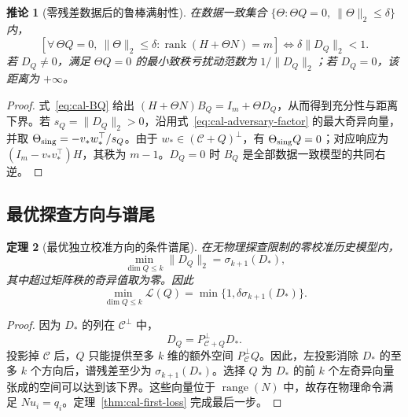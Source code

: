 \documentclass[11pt,a4paper]{article}
\numberwithin{equation}{section}
\newtheorem{theorem}{定理}[section]
\newtheorem{corollary}[theorem]{推论}
\theoremstyle{definition}
\begin{document}
\begin{corollary}[零残差数据后的鲁棒满射性]
\label{rev:cor:conditional-surjectivity}
在数据一致集合 $\{\Theta:\Theta Q=0,\ \|\Theta\|_2\le\delta\}$ 内，
\begin{equation}
 \left[
 \forall\,\Theta Q=0,\ \|\Theta\|_2\le\delta:
 \operatorname{rank}(H+\Theta N)=m
 \right]
 \iff
 \delta\|D_Q\|_2<1 .
 \label{rev:eq:conditional-rank}
\end{equation}
若 $D_Q\ne0$，满足 $\Theta Q=0$ 的最小致秩亏扰动范数为 $1/\|D_Q\|_2$；若 $D_Q=0$，该距离为 $+\infty$。
\end{corollary}
\begin{proof}
式~\eqref{eq:cal-BQ} 给出
$(H+\Theta N)B_Q=I_m+\Theta D_Q$，从而得到充分性与距离下界。若 $s_Q=\|D_Q\|_2>0$，沿用式~\eqref{eq:cal-adversary-factor} 的最大奇异向量，并取
$\Theta_{\rm sing}=-v_*w_*^\top/s_Q$。由于
$w_*\in(\mathcal C+Q)^\perp$，有 $\Theta_{\rm sing}Q=0$；对应响应为 $(I_m-v_*v_*^\top)H$，其秩为 $m-1$。$D_Q=0$ 时 $B_Q$ 是全部数据一致模型的共同右逆。
\end{proof}

\subsection{最优探查方向与谱尾}

\begin{theorem}[最优独立校准方向的条件谱尾]
\label{thm:cal-width}
在无物理探查限制的零校准历史模型内，
\begin{equation}
  \min_{\dim Q\le k}\|D_Q\|_2
  =\sigma_{k+1}(D_*),
  \label{eq:cal-quotient-width}
\end{equation}
其中超过矩阵秩的奇异值取为零。因此
\begin{equation}
  \boxed{
  \min_{\dim Q\le k}\mathcal L(Q)
  =\min\{1,\delta\sigma_{k+1}(D_*)\}.}
  \label{eq:cal-minimax-width}
\end{equation}
\end{theorem}

\begin{proof}
因为 $D_*$ 的列在 $\mathcal C^\perp$ 中，
\begin{equation}
  D_Q=P_{\mathcal C+Q}^\perp D_* .
\end{equation}
投影掉 $\mathcal C$ 后，$Q$ 只能提供至多 $k$ 维的额外空间 $P_{\mathcal C}^\perp Q$。因此，左投影消除 $D_*$ 的至多 $k$ 个方向后，谱残差至少为 $\sigma_{k+1}(D_*)$。选择 $Q$ 为 $D_*$ 的前 $k$ 个左奇异向量张成的空间可以达到该下界。这些向量位于 $\operatorname{range}(N)$ 中，故存在物理命令满足 $Nu_i=q_i$。定理~\ref{thm:cal-first-loss} 完成最后一步。
\end{proof}
\end{document}
